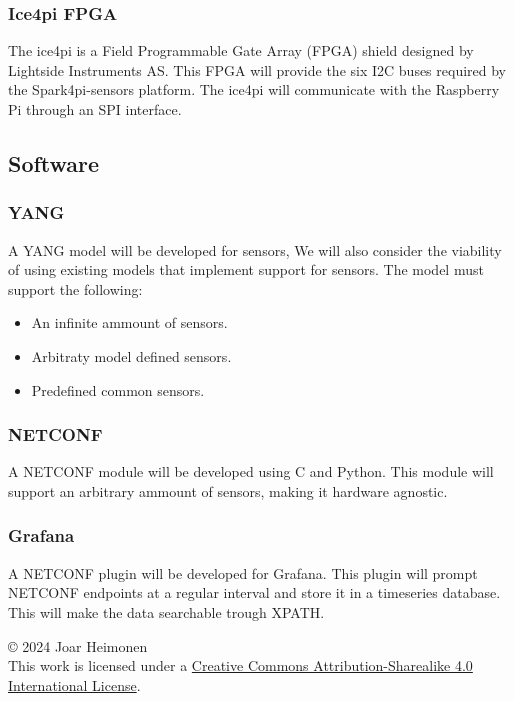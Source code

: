 \documentclass[12pt]{article}
\newcommand{\license}{
    \vspace{1em}
    \noindent\small{© 2024 Joar Heimonen\\
    This work is licensed under a \href{https://creativecommons.org/licenses/by-sa/4.0/}{Creative Commons Attribution-Sharealike 4.0 International License}.}
}
\begin{document}
\subsubsection{Ice4pi FPGA}
The ice4pi is a Field Programmable Gate Array (FPGA) shield designed by Lightside Instruments AS.
This FPGA will provide the six I2C buses required by the Spark4pi-sensors platform. 
The ice4pi will communicate with the Raspberry Pi through an SPI interface.

\subsection{Software}
\subsubsection{YANG}
A YANG model will be developed for sensors, We will also consider the viability of using existing models that implement support for sensors.
The model must support the following:
\begin{itemize}
  \item An infinite ammount of sensors.
  \item Arbitraty model defined sensors.
  \item Predefined common sensors.
\end{itemize}

\subsubsection{NETCONF}
A NETCONF module will be developed using C and Python. This module will support an arbitrary ammount of sensors,
making it hardware agnostic.

\subsubsection{Grafana}
A NETCONF plugin will be developed for Grafana. This plugin will prompt NETCONF endpoints at a regular interval and store it in a timeseries database.
This will make the data searchable trough XPATH.

\pagebreak
{}
\printbibliography
\license
\end{document}
